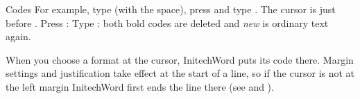 \begin{Feature}{Codes}
For example, type (with the space), press 
and type .  The cursor is just before \Code{[bold]}.  Press
:
Type : both bold codes are deleted and \textit{new} is ordinary
text again.
\EndReplay

When you choose a format at the cursor, InitechWord puts its code there.
Margin settings and justification take effect at the start of a line, so if
the cursor is not at the left margin InitechWord first ends the line there
(see  and ).

\end{Feature}

